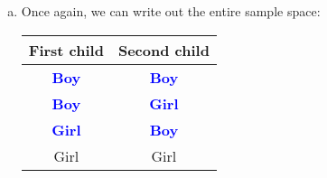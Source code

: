 \documentclass[12pt]{article}
\newcommand{\cond}[1]{\textbf{\textcolor{blue}{#1}}}
\begin{document}
{\begin{enumerate}[(a)]
            Using computations similar to those in (a), we can see that all 4
            possibilities are equally likely. If we observe that the younger
            child is a boy, we can eliminate the third and fourth
            possibilities. One out of the two remaining possibilities satisfies
            the event we are looking for (``both children are boys''). So, the
            probability is $\frac{1}{2}$.
        \item Once again, we can write out the entire sample space:
            \begin{table}[h!]
                \centering
                \begin{tabular}{|c|c|}
                    \hline
                    First child & Second child \\ \hline
                    \cond{Boy} & \cond{Boy} \\ \cond{Boy} & \cond{Girl} \\ \cond{Girl} & \cond{Boy} \\ Girl & Girl \\ \hline
                \end{tabular}
            \end{table}


\end{enumerate}}
\end{document}
